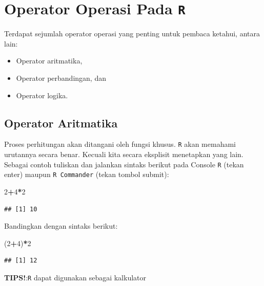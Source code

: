 \documentclass[12pt,]{krantz}
\newenvironment{Shaded}{\begin{snugshade}}{\end{snugshade}}
\newcommand{\DecValTok}[1]{\textcolor[rgb]{0.00,0.00,0.81}{#1}}
\newcommand{\NormalTok}[1]{#1}
\newcommand{\OperatorTok}[1]{\textcolor[rgb]{0.81,0.36,0.00}{\textbf{#1}}}
\providecommand{\tightlist}{%
  \setlength{\itemsep}{0pt}\setlength{\parskip}{0pt}}
\renewenvironment{quote}{\begin{VF}}{\end{VF}}
\begin{document}
\hypertarget{operator-operasi-pada-r}{%
\section{\texorpdfstring{Operator Operasi Pada \texttt{R}}{Operator Operasi Pada R}}\label{operator-operasi-pada-r}}

Terdapat sejumlah operator operasi yang penting untuk pembaca ketahui, antara lain:

\begin{itemize}
\tightlist
\item
  Operator aritmatika,
\item
  Operator perbandingan, dan
\item
  Operator logika.
\end{itemize}

\hypertarget{aritmatikop}{%
\subsection{Operator Aritmatika}\label{aritmatikop}}

Proses perhitungan akan ditangani oleh fungsi khusus. \texttt{R} akan memahami urutannya secara benar. Kecuali kita secara eksplisit menetapkan yang lain. Sebagai contoh tuliskan dan jalankan sintaks berikut pada Console \texttt{R} (tekan enter) maupun \texttt{R\ Commander} (tekan tombol submit):

\begin{Shaded}
\begin{Highlighting}[]
\DecValTok{2}\OperatorTok{+}\DecValTok{4}\OperatorTok{*}\DecValTok{2}
\end{Highlighting}
\end{Shaded}

\begin{verbatim}
## [1] 10
\end{verbatim}

Bandingkan dengan sintaks berikut:

\begin{Shaded}
\begin{Highlighting}[]
\NormalTok{(}\DecValTok{2}\OperatorTok{+}\DecValTok{4}\NormalTok{)}\OperatorTok{*}\DecValTok{2}
\end{Highlighting}
\end{Shaded}

\begin{verbatim}
## [1] 12
\end{verbatim}

\begin{quote}
\textbf{TIPS!}:\texttt{R} dapat digunakan sebagai kalkulator
\end{quote}
\end{document}
